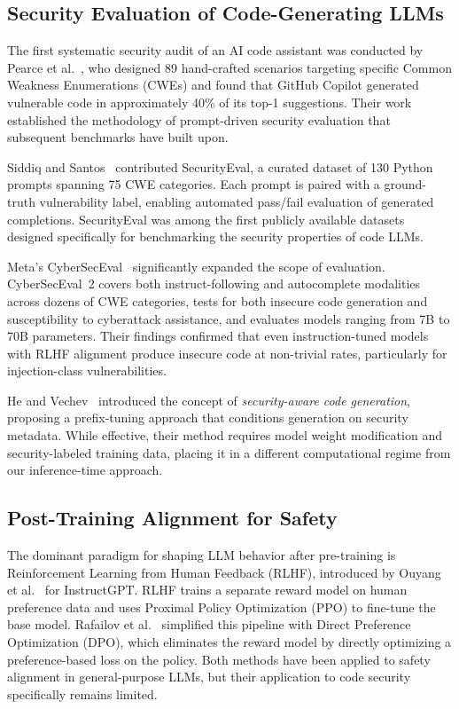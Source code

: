\documentclass[journal, onecolumn]{IEEEtran}
\begin{document}
\subsection{Security Evaluation of Code-Generating LLMs}

The first systematic security audit of an AI code assistant was conducted by Pearce et al.~\cite{pearce2022}, who designed 89 hand-crafted scenarios targeting specific Common Weakness Enumerations (CWEs) and found that GitHub Copilot generated vulnerable code in approximately 40\% of its top-1 suggestions. Their work established the methodology of prompt-driven security evaluation that subsequent benchmarks have built upon.

Siddiq and Santos~\cite{siddiq2022} contributed SecurityEval, a curated dataset of 130 Python prompts spanning 75 CWE categories. Each prompt is paired with a ground-truth vulnerability label, enabling automated pass/fail evaluation of generated completions. SecurityEval was among the first publicly available datasets designed specifically for benchmarking the security properties of code LLMs.

Meta's CyberSecEval~\cite{bhatt2024} significantly expanded the scope of evaluation. CyberSecEval~2 covers both instruct-following and autocomplete modalities across dozens of CWE categories, tests for both insecure code generation and susceptibility to cyberattack assistance, and evaluates models ranging from 7B to 70B parameters. Their findings confirmed that even instruction-tuned models with RLHF alignment produce insecure code at non-trivial rates, particularly for injection-class vulnerabilities.

He and Vechev~\cite{he2023} introduced the concept of \textit{security-aware code generation}, proposing a prefix-tuning approach that conditions generation on security metadata. While effective, their method requires model weight modification and security-labeled training data, placing it in a different computational regime from our inference-time approach.

\subsection{Post-Training Alignment for Safety}

The dominant paradigm for shaping LLM behavior after pre-training is Reinforcement Learning from Human Feedback (RLHF), introduced by Ouyang et al.~\cite{ouyang2022} for InstructGPT. RLHF trains a separate reward model on human preference data and uses Proximal Policy Optimization (PPO) to fine-tune the base model. Rafailov et al.~\cite{rafailov2023} simplified this pipeline with Direct Preference Optimization (DPO), which eliminates the reward model by directly optimizing a preference-based loss on the policy. Both methods have been applied to safety alignment in general-purpose LLMs, but their application to code security specifically remains limited.
\end{document}
